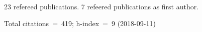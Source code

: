 23 refereed publications. 7 refeered publications as first author.

               Total citations~=~419; h-index~=~9 (2018-09-11)